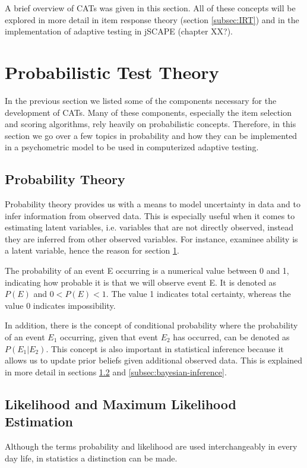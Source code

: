 A brief overview of CATs was given in this section. All of these concepts will be explored in more detail in item response theory (section \ref{subsec:IRT}) and in the implementation of adaptive testing in jSCAPE (chapter XX?).

\section{Probabilistic Test Theory}
\label{sec:probabilistic-test-theory}
In the previous section we listed some of the components necessary for the development of CATs. Many of these components, especially the item selection and scoring algorithms, rely heavily on probabilistic concepts. Therefore, in this section we go over a few topics in probability and how they can be implemented in a psychometric model to be used in computerized adaptive testing.

\subsection{Probability Theory}
Probability theory provides us with a means to model uncertainty in data and to infer information from observed data. This is especially useful when it comes to estimating latent variables, i.e. variables that are not directly observed, instead they are inferred from other observed variables. For instance, examinee ability is a latent variable, hence the reason for section \ref{sec:probabilistic-test-theory}.
\newline

The probability of an event E occurring is a numerical value between 0 and 1, indicating how probable it is that we will observe event E. It is denoted as $P(E)$ and $0 < P(E) < 1$. The value 1 indicates total certainty, whereas the value 0 indicates impossibility. \newline

In addition, there is the concept of conditional probability where the probability of an event $E_1$ occurring, given that event $E_2$ has occurred, can be denoted as $P(E_1|E_2)$. This concept is also important in statistical inference because it allows us to update prior beliefs given additional observed data. This is explained in more detail in sections \ref{subsec:likelihood-and-mle} and \ref{subsec:bayesian-inference}.

\subsection{Likelihood and Maximum Likelihood Estimation}
\label{subsec:likelihood-and-mle}
Although the terms probability and likelihood are used interchangeably in every day life, in statistics a distinction can be made.\newline

